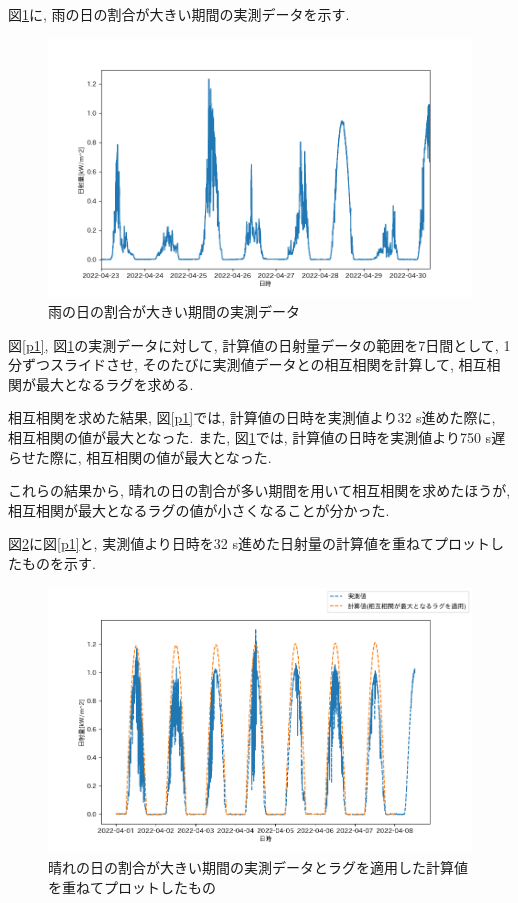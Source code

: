 \documentclass[a4j,12pt,]{jarticle}
\begin{document}
図\ref{p2}に, 雨の日の割合が大きい期間の実測データを示す.

\begin{figure}[H]
  \begin{center}
    \includegraphics[width=160mm]{2.png}
    \caption{雨の日の割合が大きい期間の実測データ}
    \label{p2}
  \end{center}
\end{figure}

図\ref{p1}, 図\ref{p2}の実測データに対して, 計算値の日射量データの範囲を7日間として, 1分ずつスライドさせ, そのたびに実測値データとの相互相関を計算して, 相互相関が最大となるラグを求める.

相互相関を求めた結果, 図\ref{p1}では, 計算値の日時を実測値より32 \si{\second}進めた際に, 相互相関の値が最大となった.
また, 図\ref{p2}では, 計算値の日時を実測値より750 \si{\second}遅らせた際に, 相互相関の値が最大となった.

これらの結果から, 晴れの日の割合が多い期間を用いて相互相関を求めたほうが, 相互相関が最大となるラグの値が小さくなることが分かった.

図\ref{p3}に図\ref{p1}と, 実測値より日時を32 \si{\second}進めた日射量の計算値を重ねてプロットしたものを示す.

\begin{figure}[H]
  \begin{center}
    \includegraphics[width=160mm]{3.png}
    \caption{晴れの日の割合が大きい期間の実測データとラグを適用した計算値を重ねてプロットしたもの}
    \label{p3}
  \end{center}
\end{figure}
\end{document}
